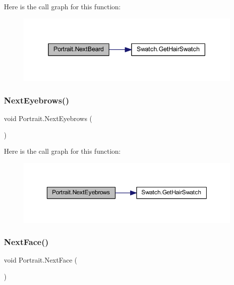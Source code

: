 Here is the call graph for this function\+:
\nopagebreak
\begin{figure}[H]
\begin{center}
\leavevmode
\includegraphics[width=330pt]{class_portrait_a357f23630fd1689f2de8ef7a114c151e_cgraph}
\end{center}
\end{figure}
\mbox{\label{class_portrait_a6390e5c0ba5e52e4913703caf40682cd}} 
\subsubsection{\texorpdfstring{NextEyebrows()}{NextEyebrows()}}
{\footnotesize\ttfamily void Portrait.\+Next\+Eyebrows (\begin{DoxyParamCaption}{ }\end{DoxyParamCaption})}

Here is the call graph for this function\+:
\nopagebreak
\begin{figure}[H]
\begin{center}
\leavevmode
\includegraphics[width=347pt]{class_portrait_a6390e5c0ba5e52e4913703caf40682cd_cgraph}
\end{center}
\end{figure}
\mbox{\label{class_portrait_aaa0da57aae916077e97d6c9d0a48aa4d}} 
\subsubsection{\texorpdfstring{NextFace()}{NextFace()}}
{\footnotesize\ttfamily void Portrait.\+Next\+Face (\begin{DoxyParamCaption}{ }\end{DoxyParamCaption})}

